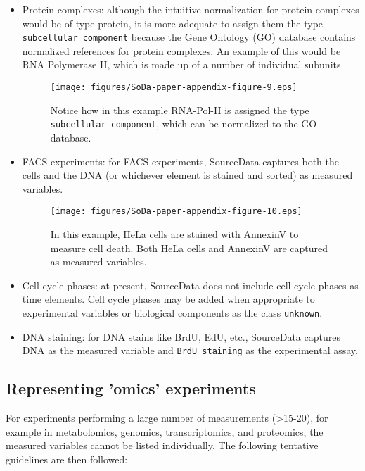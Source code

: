\documentclass{bioinfo}
\begin{document}
\begin{itemize}
    \item Protein complexes: although the intuitive normalization for protein complexes would be of type protein, it is more adequate to assign them the type \texttt{subcellular component} because the Gene Ontology (GO) database contains normalized references for protein complexes. An example of this would be RNA Polymerase II, which is made up of a number of individual subunits.
    
\begin{figure*}
    \centering
    \texttt{[image: figures/SoDa-paper-appendix-figure-9.eps]}
        \caption{Notice how in this example RNA-Pol-II is assigned the type \texttt{subcellular component}, which can be normalized to the GO database.}
        \label{fig:protein_complexes}
    \end{figure*}

    \item FACS experiments: for FACS experiments, SourceData captures both the cells and the DNA (or whichever element is stained and sorted) as measured variables.
    
\begin{figure*}
    \centering
    \texttt{[image: figures/SoDa-paper-appendix-figure-10.eps]}
        \caption{In this example, HeLa cells are stained with AnnexinV to measure cell death. Both HeLa cells and AnnexinV are captured as measured variables.}
        \label{fig:FACS}
    \end{figure*}

    \item Cell cycle phases: at present, SourceData does not include cell cycle phases as time elements. Cell cycle phases may be added when appropriate to experimental variables or biological components as the class \texttt{unknown}.
    \item DNA staining: for DNA stains like BrdU, EdU, etc., SourceData captures DNA as the measured variable and \texttt{BrdU staining} as the experimental assay.
\end{itemize}

\subsection{Representing 'omics' experiments}\label{app:representing-omics-experiments}
For experiments performing a large number of measurements (>15-20), for example in metabolomics, genomics, transcriptomics, and proteomics, the measured variables cannot be listed individually. The following tentative guidelines are then followed:
\end{document}
